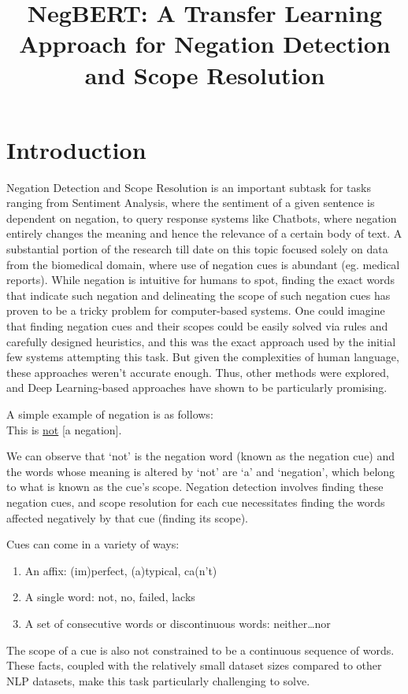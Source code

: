 \documentclass[10pt, a4paper]{article}
\title{NegBERT: A Transfer Learning Approach for Negation Detection and Scope Resolution}
\begin{document}
\maketitleabstract

\section{Introduction}

Negation Detection and Scope Resolution is an important subtask for tasks ranging from Sentiment Analysis, where the sentiment of a given sentence is dependent on negation, to query response systems like Chatbots, where negation entirely changes the meaning and hence the relevance of a certain body of text. A substantial portion of the research till date on this topic focused solely on data from the biomedical domain, where use of negation cues is abundant (eg. medical reports). While negation is intuitive for humans to spot, finding the exact words that indicate such negation and delineating the scope of such negation cues has proven to be a tricky problem for computer-based systems. One could imagine that finding negation cues and their scopes could be easily solved via rules and carefully designed heuristics, and this was the exact approach used by the initial few systems attempting this task. But given the complexities of human language, these approaches weren’t accurate enough. Thus, other methods were explored, and Deep Learning-based approaches have shown to be particularly promising.
\begin{center}
A simple example of negation is as follows:\\
This is \underline{not} [a negation].
\end{center} 
\par We can observe that ‘not’ is the negation word (known as the negation cue) and the words whose meaning is altered by ‘not’ are ‘a’ and ‘negation’, which belong to what is known as the cue’s scope. Negation detection involves finding these negation cues, and scope resolution for each cue necessitates finding the words affected negatively by that cue (finding its scope).
\par Cues can come in a variety of ways:
\begin{enumerate}[noitemsep]
    \item An affix: (im)perfect, (a)typical, ca(n’t)
    \item A single word: not, no, failed, lacks
    \item A set of consecutive words or discontinuous words:
	neither…nor
\end{enumerate}
The scope of a cue is also not constrained to be a continuous sequence of words. These facts, coupled with the relatively small dataset sizes compared to other NLP datasets, make this task particularly challenging to solve.
\end{document}
